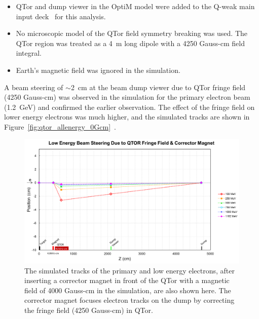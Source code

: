 \begin{itemize}
\doublespacing
\item QTor and dump viewer in the OptiM model were added to the Q-weak main input deck~\cite{jay_communication} for this analysis.
\item No microscopic model of the QTor field symmetry breaking was used. The QTor region was treated as a 4~m long dipole with a 4250 Gauss-cm field integral.
\item Earth's magnetic field was ignored in the simulation.
\end{itemize}

A beam steering of $\sim$2~cm at the beam dump viewer due to QTor fringe field (4250 Gauss-cm) was observed in the simulation for the primary electron beam (1.2~GeV) and confirmed the earlier observation. The effect of the fringe field on lower energy electrons was much higher, and the simulated tracks are shown in Figure~\ref{fig:qtor_allenergy_0Gcm}~\cite{elog:nur_qtor4}. 

\begin{singlespace}
\begin{figure}[!h]
	\begin{center}
		\includegraphics[width=15.0cm]{figures/qtor_allenergy_4000Gcm_sacle_dump}
	\end{center}
	\caption
		{The simulated tracks of the primary and low energy electrons, after inserting a corrector magnet in front of the QTor with a magnetic field of 4000 Gauss-cm in the simulation, are also shown here. The corrector magnet focuses electron tracks on the dump by correcting the fringe field (4250 Gauss-cm) in QTor.}
		\label{fig:qtor_allenergy_4000Gcm_sacle_dump}
\end{figure}
\end{singlespace}

